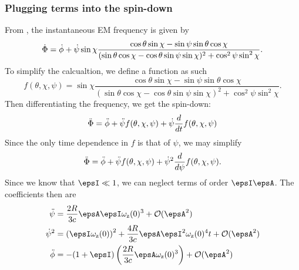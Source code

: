 \documentclass[/home/greg/Thesis/main/main.tex]{subfiles}
\begin{document}
\subsubsection{Plugging terms into the spin-down}
From \citet{Jones2001}, the instantaneous EM frequency is given by 
\begin{equation}
\dot{\Phi} = \dot{\phi} + \dot{\psi} \sin\chi
\frac{\cos\theta\sin\chi - \sin\psi\sin\theta\cos\chi}{
    (\sin\theta\cos\chi - \cos\theta\sin\psi\sin\chi)^{2} + \cos^{2}\psi\sin^{2}\chi}.
\end{equation}
To simplify the calcualtion, we define a function as such
\begin{equation}
f(\theta, \chi, \psi) = \sin\chi
\frac{\cos\theta\sin\chi - \sin\psi\sin\theta\cos\chi}{
    (\sin\theta\cos\chi - \cos\theta\sin\psi\sin\chi)^{2} + \cos^{2}\psi\sin^{2}\chi}.
\end{equation}
Then differentiating the frequency, we get the spin-down:
\begin{align}
\ddot{\Phi} = \ddot{\phi} + \ddot{\psi}f(\theta, \chi, \psi) + \dot{\psi}\frac{d}{dt}f(\theta, \chi, \psi)
\end{align}
Since the only time dependence in $f$ is that of $\psi$, we may simplify
\begin{align}
\ddot{\Phi} = \ddot{\phi} + \ddot{\psi}f(\theta, \chi, \psi) + \dot{\psi}^{2}\frac{d}{d\psi}f(\theta, \chi, \psi).
\end{align}
Since we know  that $\epsI \ll 1$, we can neglect terms of order $\epsI\epsA$. 
The coefficients then are 
\begin{align}
\ddot{\psi} & = \frac{2R}{3c}\epsA\epsI \wz(0)^{3} + \mathcal{O}(\epsA^{2}) \\
\dot{\psi}^{2} & = \left(\epsI \wz(0)\right)^{2} + \frac{4R}{3c} \epsA \epsI^{2} \wz(0)^{4} t +  \mathcal{O}(\epsA^{2}) \\
\ddot{\phi} & = -(1+\epsI)\left(\frac{2R}{3c} \epsA \wz(0)^{3}\right) + \mathcal{O}(\epsA^{2})
\end{align}

%
\end{document}
